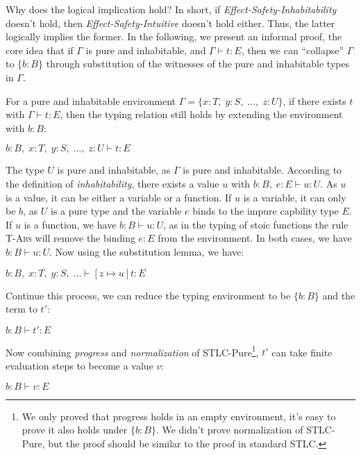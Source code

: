 Why does the logical implication hold? In short, if
\emph{Effect-Safety-Inhabitability} doesn't hold, then
\emph{Effect-Safety-Intuitive} doesn't hold either. Thus, the latter
logically implies the former.  In the following, we present an
informal proof, the core idea that if $\Gamma$ is pure and
inhabitable, and $\Gamma \vdash t : E$, then we can ``collapse''
$\Gamma$ to $\{b : B\}$ through substitution of the witnesses of the
pure and inhabitable types in $\Gamma$.

For a pure and inhabitable environment
$\Gamma = \{x:T, \; y:S, \; \dots, \; z:U\}$, if there exists $t$ with
$\Gamma \vdash t : E$, then the typing relation still holds by
extending the environment with $b:B$:

\begin{center}
$b:B, \; x:T, \; y:S, \; \dots, \; z:U \vdash t: E$
\end{center}

The type $U$ is pure and inhabitable, as $\Gamma$ is pure and
inhabitable. According to the definition of \emph{inhabitability},
there exists a value $u$ with $b:B, \; e:E \vdash u: U$. As $u$ is a
value, it can be either a variable or a function. If $u$ is a
variable, it can only be $b$, as $U$ is a pure type and the variable
$e$ binds to the impure capbility type $E$. If $u$ is a function, we
have $b:B \vdash u: U$, as in the typing of stoic functions the rule
\textsc{T-Abs} will remove the binding $e:E$ from the environment. In
both cases, we have $b:B \vdash u: U$. Now using the substitution
lemma, we have:

\begin{center}
$b:B, \; x:T, \; y:S, \; \dots \vdash [z \mapsto u]t: E$
\end{center}

Continue this process, we can reduce the typing environment to be
$\{b:B\}$ and the term to $t'$:

\begin{center}
$b:B \vdash t': E$
\end{center}

Now combining \emph{progress} and \emph{normalization} of
STLC-Pure\footnote{We only proved that progress holds in an empty
  environment, it's easy to prove it also holds under $\{b:B\}$. We
  didn't prove normalization of STLC-Pure, but the proof should be
  similar to the proof in standard STLC.}, $t'$ can take finite
evaluation steps to become a value $v$:

\begin{center}
$b:B \vdash v: E$
\end{center}

